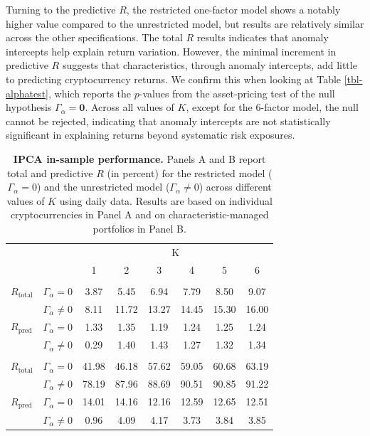 \documentclass[
  12pt,
  a4paper,
  openany]{scrbook}
\begin{document}
Turning to the predictive \(R\), the restricted one-factor model shows a
notably higher value compared to the unrestricted model, but results are
relatively similar across the other specifications. The total \(R\)
results indicates that anomaly intercepts help explain return variation.
However, the minimal increment in predictive \(R\) suggests that
characteristics, through anomaly intercepts, add little to predicting
cryptocurrency returns. We confirm this when looking at Table
\ref{tbl-alphatest}, which reports the \(p\)-values from the
asset-pricing test of the null hypothesis
\(\Gamma_\alpha = \mathbf{0}\). Across all values of \(K\), except for
the 6-factor model, the null cannot be rejected, indicating that anomaly
intercepts are not statistically significant in explaining returns
beyond systematic risk exposures.

\begin{table}[h]
\centering
\small
\caption[IPCA in-sample performance.]%
{%
\textbf{IPCA in-sample performance.}
Panels A and B report total and predictive $R$ (in percent) for the restricted model ($\Gamma_\alpha = 0$) and the unrestricted model ($\Gamma_\alpha \neq 0$) across different values of $K$ using daily data. Results are based on individual cryptocurrencies in Panel A and on characteristic-managed portfolios in Panel B. 
}
\label{tbl-ipca_results}
\vspace{5pt} %
\begin{tabular}{lccccccc}
\toprule
 &  & \multicolumn{6}{c}{K} \\
\cmidrule(lr){3-8}
 &  & 1 & 2 & 3 & 4 & 5 & 6 \\
\midrule\addlinespace[2.5pt]
\multicolumn{8}{l}{Panel A: Individual cryptocurrencies ($r_t$)} \\[2.5pt]
\midrule\addlinespace[2.5pt]
$R_{\text{total}}$      & $\Gamma_{\alpha} = 0$     & 3.87 & 5.45 & 6.94 & 7.79 & 8.50 & 9.07 \\
                            & $\Gamma_{\alpha} \neq 0$  & 8.11 & 11.72 & 13.27 & 14.45 & 15.30 & 16.00 \\
$R_{\text{pred}}$ & $\Gamma_{\alpha} = 0$     & 1.33 & 1.35 & 1.19 & 1.24 & 1.25 & 1.24 \\
                            & $\Gamma_{\alpha} \neq 0$  & 0.29 & 1.40 & 1.43 & 1.27 & 1.32 & 1.34 \\
\midrule\addlinespace[2.5pt]
\multicolumn{8}{l}{Panel B: Managed portfolios ($x_t$)} \\[2.5pt]
\midrule\addlinespace[2.5pt]
$R_{\text{total}}$      & $\Gamma_{\alpha} = 0$     & 41.98 & 46.18 & 57.62 & 59.05 & 60.68 & 63.19 \\
                            & $\Gamma_{\alpha} \neq 0$  & 78.19 & 87.96 & 88.69 & 90.51 & 90.85 & 91.22 \\
$R_{\text{pred}}$ & $\Gamma_{\alpha} = 0$     & 14.01 & 14.16 & 12.16 & 12.59 & 12.65 & 12.51 \\
                            & $\Gamma_{\alpha} \neq 0$  & 0.96 & 4.09 & 4.17 & 3.73 & 3.84 & 3.85 \\
\bottomrule
\end{tabular}
\end{table}
\end{document}
